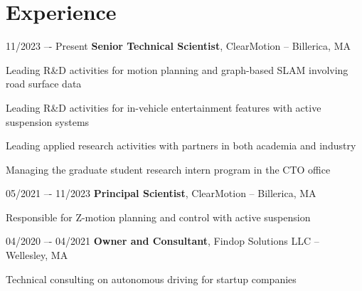 \section{Experience}
\begin{twocolentry}{11/2023 –- Present}
\textbf{Senior Technical Scientist}, ClearMotion -- Billerica, MA\end{twocolentry}
\vspace{0.10 cm}

\begin{onecolentry}
\begin{highlights}
    \item Leading R\&D activities for motion planning and graph-based SLAM involving road surface data
    \item Leading R\&D activities for in-vehicle entertainment features with active suspension systems
    \item Leading applied research activities with partners in both academia and industry
    \item Managing the graduate student research intern program in the CTO office
\end{highlights}
\end{onecolentry}
\vspace{0.25 cm}
        
\begin{twocolentry}{05/2021 –- 11/2023}
    \textbf{Principal Scientist}, ClearMotion -- Billerica, MA\end{twocolentry}
    \vspace{0.10 cm}
\begin{onecolentry}
    \begin{highlights}
    \item Responsible for Z-motion planning and control with active suspension
    \end{highlights}
\end{onecolentry}
\vspace{0.25 cm}

\begin{twocolentry}{
04/2020 –- 04/2021
}
\textbf{Owner and Consultant}, Findop Solutions LLC -- Wellesley, MA\end{twocolentry}
\vspace{0.10 cm}
\begin{onecolentry}
\begin{highlights}
\item Technical consulting on autonomous driving for startup companies
\end{highlights}
\end{onecolentry}
\vspace{0.25 cm}

